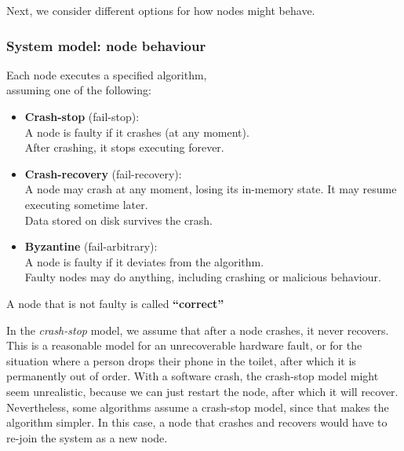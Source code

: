 Next, we consider different options for how nodes might behave.

\begin{frame}
    \label{s:model-nodes}
    \frametitle{System model: node behaviour}
    Each node executes a specified algorithm,\\assuming one of the following:
    \begin{itemize}
        \item \textbf{Crash-stop} (fail-stop):\\
            A node is faulty if it crashes (at any moment).\\
            After crashing, it stops executing forever.\pause
        \item \textbf{Crash-recovery} (fail-recovery):\\
            A node may crash at any moment, losing its in-memory state.
            It may resume executing sometime later.\\
            Data stored on disk survives the crash.\pause
        \item \textbf{Byzantine} (fail-arbitrary):\\
            A node is faulty if it deviates from the algorithm.\\
            Faulty nodes may do anything, including crashing or malicious behaviour.\\[1em]
    \end{itemize}
    A node that is not faulty is called \textbf{``correct''}
\end{frame}
\label{l:model-nodes}



In the \emph{crash-stop} model, we assume that after a node crashes, it never recovers.
This is a reasonable model for an unrecoverable hardware fault, or for the situation where a person drops their phone in the toilet, after which it is permanently out of order.
With a software crash, the crash-stop model might seem unrealistic, because we can just restart the node, after which it will recover.
Nevertheless, some algorithms assume a crash-stop model, since that makes the algorithm simpler.
In this case, a node that crashes and recovers would have to re-join the system as a new node.


